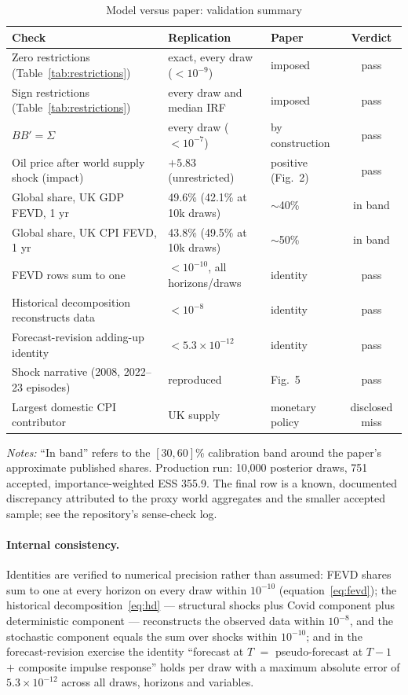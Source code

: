 \begin{table}[t]
\centering
\caption{Model versus paper: validation summary}
\label{tab:validation}
\footnotesize
\begin{tabularx}{\textwidth}{@{}>{\raggedright\arraybackslash}Xllc@{}}
\toprule
Check & Replication & Paper & Verdict \\
\midrule
Zero restrictions (Table~\ref{tab:restrictions}) & exact, every draw ($<10^{-9}$) & imposed & pass \\
Sign restrictions (Table~\ref{tab:restrictions}) & every draw and median IRF & imposed & pass \\
$BB' = \Sigma$ & every draw ($<10^{-7}$) & by construction & pass \\
Oil price after world supply shock (impact) & $+5.83$ (unrestricted) & positive (Fig.~2) & pass \\
Global share, UK GDP FEVD, 1 yr & 49.6\% (42.1\% at 10k draws) & $\sim$40\% & in band \\
Global share, UK CPI FEVD, 1 yr & 43.8\% (49.5\% at 10k draws) & $\sim$50\% & in band \\
FEVD rows sum to one & $<10^{-10}$, all horizons/draws & identity & pass \\
Historical decomposition reconstructs data & $<10^{-8}$ & identity & pass \\
Forecast-revision adding-up identity & $<5.3\times10^{-12}$ & identity & pass \\
Shock narrative (2008, 2022--23 episodes) & reproduced & Fig.~5 & pass \\
Largest domestic CPI contributor & UK supply & monetary policy & disclosed miss \\
\bottomrule
\end{tabularx}
\par\smallskip
\parbox{0.95\textwidth}{\footnotesize \emph{Notes:} ``In band'' refers to the $[30,60]$\% calibration band around the paper's approximate published shares. Production run: 10{,}000 posterior draws, 751 accepted, importance-weighted ESS 355.9. The final row is a known, documented discrepancy attributed to the proxy world aggregates and the smaller accepted sample; see the repository's sense-check log.}
\end{table}

\paragraph{Internal consistency.} Identities are verified to numerical precision rather than assumed: FEVD shares sum to one at every horizon on every draw within $10^{-10}$ (equation~\ref{eq:fevd}); the historical decomposition~\eqref{eq:hd} --- structural shocks plus Covid component plus deterministic component --- reconstructs the observed data within $10^{-8}$, and the stochastic component equals the sum over shocks within $10^{-10}$; and in the forecast-revision exercise the identity ``forecast at $T$ $=$ pseudo-forecast at $T{-}1$ $+$ composite impulse response'' holds per draw with a maximum absolute error of $5.3\times10^{-12}$ across all draws, horizons and variables.

